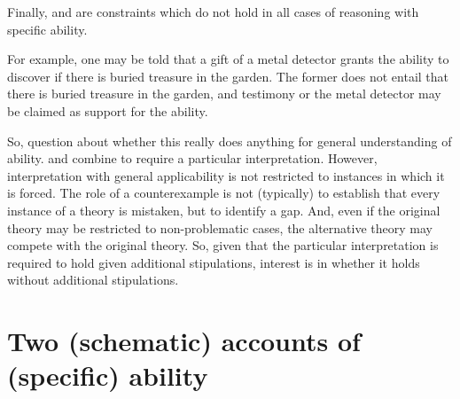 \begin{note}
  Finally, \gsi{} and  are constraints which do not hold in all cases of reasoning with specific ability.

  For example, one may be told that a gift of a metal detector grants the ability to discover if there is buried treasure in the garden.
  The former does not entail that there is buried treasure in the garden, and testimony or the metal detector may be claimed as support for the ability.

  So, question about whether this really does anything for general understanding of ability.
  \gsi{} and  combine to require a particular interpretation.
  However, interpretation with general applicability is not restricted to instances in which it is forced.
  The role of a counterexample is not (typically) to establish that every instance of a theory is mistaken, but to identify a gap.
  And, even if the original theory may be restricted to non-problematic cases, the alternative theory may compete with the original theory.
  So, given that the particular interpretation is required to hold given additional stipulations, interest is in whether it holds without additional stipulations.
\end{note}

\section{Two (schematic) accounts of (specific) ability}
\label{sec:wr-ar}

